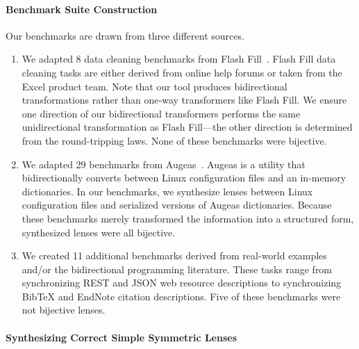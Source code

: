 \documentclass[12pt]{article}
\begin{document}
{\paragraph*{Benchmark Suite Construction}
Our benchmarks are drawn from three different sources.
\begin{enumerate}
\item We adapted 8 data cleaning benchmarks from Flash Fill~\cite{flashfill}. Flash Fill data
  cleaning tasks are either derived from online help forums or taken from the
  Excel product team. Note that our tool produces bidirectional transformations
  rather than one-way transformers like Flash Fill. We ensure one direction of
  our bidirectional transformers performs the same unidirectional transformation
  as Flash Fill---the other direction is determined from the round-tripping
  laws. None of these benchmarks were bijective.
\item We adapted 29 benchmarks from Augeas~\cite{augeas}. Augeas is a utility
  that bidirectionally converts between Linux configuration files and an
  in-memory dictionaries. In our benchmarks, we synthesize lenses between Linux
  configuration files and serialized versions of Augeas dictionaries. Because
  these benchmarks merely transformed the information into a structured form,
  synthesized lenses were all bijective.
\item We created 11 additional benchmarks 
  derived from real-world examples and/or the bidirectional programming
  literature. These tasks range from synchronizing REST and JSON web resource
  descriptions to synchronizing BibTeX and EndNote citation descriptions. Five
  of these benchmarks were not bijective lenses.
\end{enumerate}

\paragraph*{Synthesizing Correct Simple Symmetric Lenses}

}
\end{document}
